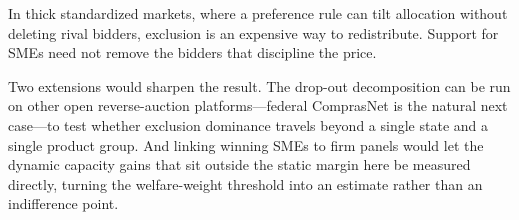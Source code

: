 In thick standardized markets, where a preference rule can tilt
allocation without deleting rival bidders, exclusion is an expensive way
to redistribute. Support for SMEs need not remove the bidders that
discipline the price.

Two extensions would sharpen the result. The drop-out decomposition can be
run on other open reverse-auction platforms---federal ComprasNet is the
natural next case---to test whether exclusion dominance travels beyond a
single state and a single product group. And linking winning SMEs to firm
panels would let the dynamic capacity gains that sit outside the static
margin here be measured directly, turning the welfare-weight threshold into
an estimate rather than an indifference point.
